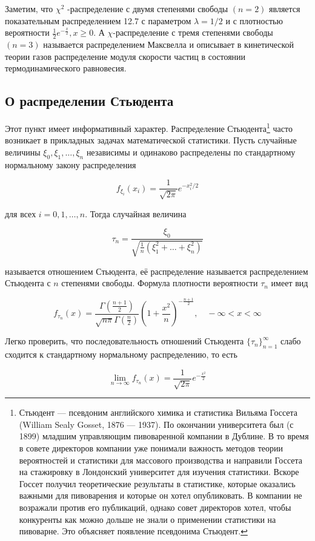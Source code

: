  \begin{zam}
Заметим, что $\chi^2$ -распределение с двумя степенями
свободы $(n = 2)$ является показательным распределением 12.7 с параметром $\lambda = 1/2$ и с плотностью вероятности $\frac{1}{2}e^{-\frac{x}{2}}, x \geq 0$. А $\chi$-распределение с тремя степенями свободы $(n = 3)$ называется распределением Максвелла и описывает в кинетической теории газов распределение модуля скорости
частиц в состоянии термодинамического равновесия.
 \end{zam}

\subsection{О распределении Стьюдента}

\begin{zam}
Этот пункт имеет информативный характер. Распределение Стьюдента\footnote{Стьюдент — псевдоним английского химика и статистика Вильяма Госсета (William Sealy Gosset, 1876
— 1937). По окончании университета был (с 1899) младшим управляющим пивоваренной компании в Дублине. В то время в совете директоров компании уже понимали важность методов
теории вероятностей и статистики для массового производства и направили Госсета на стажировку в
Лондонский университет для изучения статистики. Вскоре Госсет получил теоретические результаты в
статистике, которые оказались важными для пивоварения и которые он хотел опубликовать. В компании
не возражали против его публикаций, однако совет директоров хотел, чтобы конкуренты как можно
дольше не знали о применении статистики на пивоварне. Это объясняет появление псевдонима Стьюдент.} часто возникает в прикладных задачах математической статистики. Пусть случайные величины $\xi_0 , \xi_1 , \ldots , \xi_n$ независимы и одинаково распределены по стандартному нормальному закону распределения

$$f_{\xi_i} (x_i) = \frac{1}{\sqrt{2\pi}}e^{{-x^2_i/2}}$$

для всех $i = 0, 1, \ldots , n$. Тогда случайная величина

$$\tau_n = \frac{\xi_0}{\sqrt{\frac{1}{n}(\xi_1^2 + \ldots + \xi_n^2)}}$$

называется отношением Стьюдента, её распределение называется распределением Стьюдента с $n$ степенями свободы. Формула плотности вероятности $\tau_n$ имеет вид

$$f_{\tau_n}(x) = \frac{\Gamma(\frac{n+1}{2})}{\sqrt{n\pi}\Gamma(\frac{n}{2})} \left(1 + \frac{x^2}{n} \right)^{-\frac{n+1}{2}}, \quad -\infty < x < \infty$$
\end{zam} 

\begin{zam}
Легко проверить, что последовательность отношений Стьюдента $\{ \tau_n\}^{\infty}_{n=1}$ слабо сходится к стандартному нормальному распределению, то есть

$$\lim\limits_{n \to \infty} f_{\tau_n}(x) = \frac{1}{\sqrt{2\pi}}e^{-\frac{x^2}{2}}$$
\end{zam} 